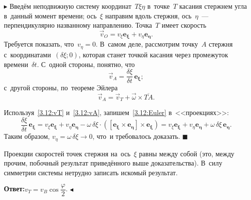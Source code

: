 \documentclass{weekly}
\begin{document}
$\blacktriangleright$ Введём неподвижную систему координат~$T\xi\eta$
в~точке~$T$ касания стержнем угла в~данный момент времени;
ось~$\xi$ направим вдоль стержня,
ось~$\eta$~--- перпендикулярно названному направлению.
Точка~$T$ имеет скорость
\begin{equation}\label{3.12:vT}
    \vec v_O = v_\xi \mathbf{e_\xi} + v_\eta \mathbf{e_\eta}.
\end{equation}
Требуется показать, что~$v_\eta = 0$. В~самом деле, рассмотрим
точку~$A$ стержня с~координатами~$(\delta \xi; 0)$,
которая станет точкой касания через промежуток времени~$\delta t$.
С~одной стороны, понятно, что
\begin{equation}\label{3.12:vA}
    \vec v_A = \frac{\delta \xi}{\delta t} \,\mathbf{e_\xi};
\end{equation}
с~другой стороны, по~теореме Эйлера
\begin{equation}\label{3.12:Euler}
    \vec v_A = \vec v_T + \vec\omega \times \overline{TA}.
\end{equation}

Используя~\eqref{3.12:vT} и~\eqref{3.12:vA}, запишем~\eqref{3.12:Euler}
в~<<проекциях>>:
\begin{equation}
    \frac{\delta\xi}{\delta t} \,\mathbf{e_\xi}
        = v_\xi \mathbf{e_\xi} + v_\eta \mathbf{e_\eta} -
            \omega\,\delta\xi \cdot
            \left(\mathbf{[e_\xi \times e_\eta] \times
                \mathbf{e_\xi}}\right)
        = v_\xi \mathbf{e_\xi} + v_\eta \mathbf{e_\eta} +
            \omega\,\delta\xi \,\mathbf{e_\eta}.
\end{equation}
Таким образом, $v_\eta = \omega \,\delta\xi \to 0$,
что~и требовалось доказать. \hfill $\blacksquare$

Проекции скоростей точек стержня
на~ось~$\xi$ равны между собой (это, между прочим, побочный результат
приведённого выше доказательства). В~силу симметрии системы
нетрудно записать искомый результат.

\textbf{Ответ:}\quad $v_T = v_B \cos\dfrac{\varphi}{2}$.
\hfill $\blacktriangleleft$
\end{document}
